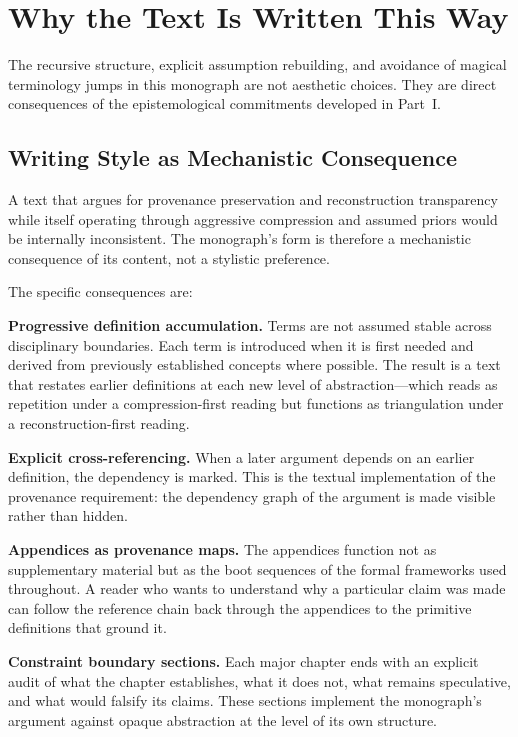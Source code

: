 \chapter{Why the Text Is Written This Way}
\label{ch:method_consequence}

\epigraph{The recursive structure, explicit assumption rebuilding, and avoidance
of magical terminology jumps in this monograph are not aesthetic choices. They
are direct consequences of the epistemological commitments developed in Part~I.}{}

\section{Writing Style as Mechanistic Consequence}

A text that argues for provenance preservation and reconstruction transparency
while itself operating through aggressive compression and assumed priors would be
internally inconsistent. The monograph's form is therefore a mechanistic
consequence of its content, not a stylistic preference.

The specific consequences are:

\textbf{Progressive definition accumulation.} Terms are not assumed stable across
disciplinary boundaries. Each term is introduced when it is first needed and
derived from previously established concepts where possible. The result is a text
that restates earlier definitions at each new level of abstraction---which reads
as repetition under a compression-first reading but functions as triangulation
under a reconstruction-first reading.

\textbf{Explicit cross-referencing.} When a later argument depends on an earlier
definition, the dependency is marked. This is the textual implementation of the
provenance requirement: the dependency graph of the argument is made visible
rather than hidden.

\textbf{Appendices as provenance maps.} The appendices function not as supplementary
material but as the boot sequences of the formal frameworks used throughout.
A reader who wants to understand why a particular claim was made can follow the
reference chain back through the appendices to the primitive definitions that
ground it.

\textbf{Constraint boundary sections.} Each major chapter ends with an explicit
audit of what the chapter establishes, what it does not, what remains speculative,
and what would falsify its claims. These sections implement the monograph's
argument against opaque abstraction at the level of its own structure.

